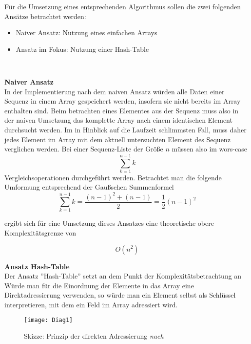 \documentclass[
10pt, %
a4paper, %
oneside, %
headinclude,footinclude, %
BCOR5mm, %
]{scrartcl}
\begin{document}
Für die Umsetzung eines entsprechenden Algorithmus sollen die zwei folgenden Ansätze betrachtet werden:
\begin{itemize}[noitemsep]
	\item Naiver Ansatz: Nutzung eines einfachen Arrays
	\item Ansatz im Fokus: Nutzung einer Hash-Table
\end{itemize}\

\textbf{Naiver Ansatz}\\
In der Implementierung nach dem naiven Ansatz würden alle Daten einer Sequenz in einem Array gespeichert werden, insofern sie nicht bereits im Array enthalten sind. Beim betrachten eines Elementes aus der Sequenz muss also in der naiven Umsetzung das komplette Array nach einem identischen Element durchsucht werden. Im in Hinblick auf die Laufzeit schlimmsten Fall, muss daher jedes Element im Array mit dem aktuell untersuchten Element des Sequenz verglichen werden. Bei einer Sequenz-Liste der Größe \(n\) müssen also im wors-case 
\begin{equation}
	\sum_{k=1}^{n-1} k
\end{equation}
Vergleichsoperationen durchgeführt werden. Betrachtet man die folgende Umformung entsprechend der Gaußschen Summenformel
\begin{equation}
	\sum_{k=1}^{n-1} k = \frac{(n-1)^2 + (n-1)}{2} = \frac{1}{2} (n-1)^2
\end{equation}


ergibt sich für eine Umsetzung dieses Ansatzes eine theoretische obere Komplexitätsgrenze von 

\begin{equation}
O(n^2)
\end{equation}


\textbf{Ansatz Hash-Table}\\
Der Ansatz ''Hash-Table'' setzt an dem Punkt der Komplexitätsbetrachtung an\\
Würde man für die Einordnung der Elemente in das Array eine Direktadressierung verwenden, so würde man ein Element selbst als Schlüssel interpretieren, mit dem ein Feld im Array adressiert wird.

\begin{figure}[h]
	\centering 
	\texttt{[image: Diag1]} 
	\caption[Skizze Direkte Adressierung]{Skizze: Prinzip der direkten Adressierung \textit{nach} \cite{Cormen:2009:IAT:1614191}}
	
\end{figure}
\end{document}
